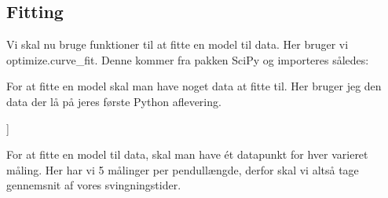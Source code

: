 \documentclass[letterpaper,10pt,english]{jupyterBook}
\begin{document}
\noindent{}


\subsection{Fitting}
\label{\detokenize{notebooks/MekRel/Funktioner_og_Scipy_optimize-checkpoint:fitting}}
Vi skal nu bruge funktioner til at fitte en model til data. Her bruger vi optimize.curve\_fit. Denne kommer fra pakken SciPy og importeres således:

\begin{sphinxVerbatim}[commandchars=\\\{\}]
   
\end{sphinxVerbatim}

For at fitte en model skal man have noget data at fitte til. Her bruger jeg den data der lå på jeres første Python aflevering.

\begin{sphinxVerbatim}[commandchars=\\\{\}]
  \PYG{p}{[}
    \PYG{p}{[}\PYG{p}{]}
    \PYG{p}{[}\PYG{p}{]}
    \PYG{p}{[}\PYG{p}{]}
    \PYG{p}{[}\PYG{p}{]}\PYG{p}{]}
\end{sphinxVerbatim}

\begin{sphinxVerbatim}[commandchars=\\\{\}]
[[0.19 1.98 2.05 2.16 2.16 2.07]
 [0.3  2.61 2.6  2.58 2.81 2.68]
 [0.36 3.   3.   3.   2.87 2.97]
 [0.53 3.47 3.83 3.54 3.6  3.5 ]]
\end{sphinxVerbatim}

For at fitte en model til data, skal man have ét datapunkt for hver varieret måling. Her har vi 5 målinger per pendullængde, derfor skal vi altså tage gennemsnit af vores svingningstider.
\end{document}
